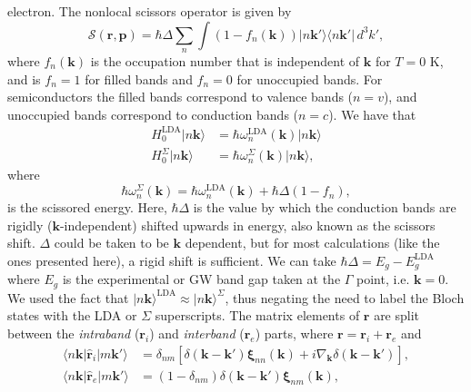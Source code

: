 electron. The nonlocal scissors operator is given by
\begin{equation}\label{chon.0}
\mathcal{S}(\mathbf{r},\mathbf{p}) = 
\hbar\Delta\sum_{n}
\int(1 - f_{n}(\mathbf{k}))\vert n\mathbf{k}'\rangle \langle n\mathbf{k}'\vert
\,d^{3}k',
\end{equation}
where $f_{n}(\mathbf{k})$ is the occupation number that is independent of
$\mathbf{k}$ for $T = 0$ K, and is $f_{n} = 1$ for filled bands and $f_{n} = 0$
for unoccupied bands. For semiconductors the filled bands correspond to valence
bands ($n = v$), and unoccupied bands correspond to conduction bands ($n = c$).
We have that
\begin{equation}\label{chon.1}
\begin{split}
H^\mathrm{LDA}_{0}\vert n\mathbf{k}\rangle
    &= \hbar\omega^{\mathrm{LDA}}_{n}(\mathbf{k})\vert n\mathbf{k}\rangle\\
H^{\Sigma}_{0}\vert n\mathbf{k}\rangle
    &= \hbar\omega^{\Sigma}_{n}(\mathbf{k})\vert n\mathbf{k}\rangle,
\end{split}
\end{equation} 
where 
\begin{equation}\label{chon.78}
\hbar\omega^{\Sigma}_{n}(\mathbf{k})
= \hbar\omega^{\mathrm{LDA}}_{n}(\mathbf{k}) + \hbar\Delta(1 - f_{n}),
\end{equation}
is the scissored energy. Here, $\hbar\Delta$ is the value by which the
conduction bands are rigidly ($\mathbf{k}$-independent) shifted upwards in
energy, also known as the scissors shift. $\Delta$ could be taken to be
$\mathbf{k}$ dependent, but for most calculations (like the ones presented
here), a rigid shift is sufficient. We can take $\hbar\Delta = E_{g} -
E_{g}^\mathrm{LDA}$ where $E_{g}$ is the experimental or GW band gap taken at
the $\Gamma$ point, i.e. $\mathbf{k} = 0$. We used the fact that $\vert
n\mathbf{k}\rangle^\mathrm{LDA} \approx \vert n\mathbf{k}\rangle^\Sigma$, thus
negating the need to label the Bloch states with the LDA or $\Sigma$
superscripts. The matrix elements of $\mathbf{r}$ are split between the
\emph{intraband} ($\mathbf{r}_{i}$) and \emph{interband} ($\mathbf{r}_{e}$)
parts, where $\mathbf{r} = \mathbf{r}_{i} + \mathbf{r}_{e}$
\cite{adamsJCP53, blountSSP62, aversaPRB95} and
\begin{align}\label{rnminn}
\langle n\mathbf{k}\vert \hat{\mathbf{r}}_{i} |m\mathbf{k}'\rangle 
&= \delta_{nm}
\left[
  \delta(\mathbf{k} - \mathbf{k}')\boldsymbol{\xi}_{nn}(\mathbf{k})
+ i\nabla_{\mathbf{k}}\delta(\mathbf{k} - \mathbf{k}')
\right],\\
\langle n\mathbf{k}| \hat{\mathbf{r}}_{e} |m\mathbf{k}'\rangle 
&= (1- \delta_{nm})\delta(\mathbf{k}-\mathbf{k}')
   \boldsymbol{\xi}_{nm}(\mathbf{k}),\label{rnmenn}
\end{align}
